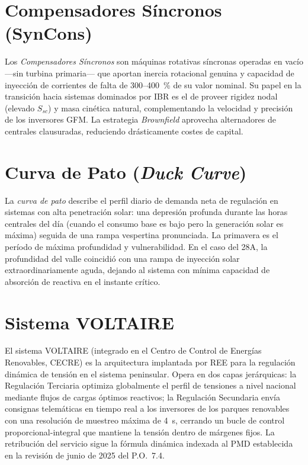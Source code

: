 \section{Compensadores Síncronos (SynCons)}
\label{anexo:syncon}
Los \textit{Compensadores Síncronos} son máquinas rotativas síncronas
operadas en vacío ---sin turbina primaria--- que aportan inercia
rotacional genuina y capacidad de inyección de corrientes de falta de
300--400~\% de su valor nominal. Su papel en la transición hacia sistemas
dominados por IBR es el de proveer rigidez nodal (elevado $S_{sc}$) y
masa cinética natural, complementando la velocidad y precisión de los
inversores GFM. La estrategia \textit{Brownfield} aprovecha alternadores
de centrales clausuradas, reduciendo drásticamente costes de capital.

\section{Curva de Pato (\textit{Duck Curve})}
\label{anexo:duck_curve}
La \textit{curva de pato} describe el perfil diario de demanda neta de
regulación en sistemas con alta penetración solar: una depresión profunda
durante las horas centrales del día (cuando el consumo base es bajo pero
la generación solar es máxima) seguida de una rampa vespertina
pronunciada. La primavera es el período de máxima profundidad y
vulnerabilidad. En el caso del 28A, la profundidad del valle coincidió
con una rampa de inyección solar extraordinariamente aguda, dejando al
sistema con mínima capacidad de absorción de reactiva en el instante
crítico.

\section{Sistema VOLTAIRE}
\label{anexo:voltaire}
El sistema VOLTAIRE (integrado en el Centro de Control de Energías
Renovables, CECRE) es la arquitectura implantada por REE para la
regulación dinámica de tensión en el sistema peninsular. Opera en dos
capas jerárquicas: la Regulación Terciaria optimiza globalmente el
perfil de tensiones a nivel nacional mediante flujos de cargas óptimos
reactivos; la Regulación Secundaria envía consignas telemáticas en
tiempo real a los inversores de los parques renovables con una resolución
de muestreo máxima de 4~s, cerrando un bucle de control proporcional-integral
que mantiene la tensión dentro de márgenes fijos. La retribución del
servicio sigue la fórmula dinámica indexada al PMD establecida en la
revisión de junio de 2025 del P.O.~7.4.

